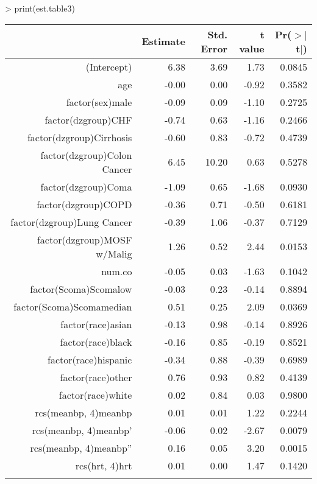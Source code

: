 \documentclass{article}
\begin{document}
\begin{Schunk}
\begin{Sinput}
> print(est.table3)
\end{Sinput}
% latex table generated in R 3.1.1 by xtable 1.7-3 package
% Fri Sep 19 22:45:02 2014
\begin{table}[ht]
\centering
\begin{tabular}{rrrrr}
  \hline
 & Estimate & Std. Error & t value & Pr($>$$|$t$|$) \\ 
  \hline
(Intercept) & 6.38 & 3.69 & 1.73 & 0.0845 \\ 
  age & -0.00 & 0.00 & -0.92 & 0.3582 \\ 
  factor(sex)male & -0.09 & 0.09 & -1.10 & 0.2725 \\ 
  factor(dzgroup)CHF & -0.74 & 0.63 & -1.16 & 0.2466 \\ 
  factor(dzgroup)Cirrhosis & -0.60 & 0.83 & -0.72 & 0.4739 \\ 
  factor(dzgroup)Colon Cancer & 6.45 & 10.20 & 0.63 & 0.5278 \\ 
  factor(dzgroup)Coma & -1.09 & 0.65 & -1.68 & 0.0930 \\ 
  factor(dzgroup)COPD & -0.36 & 0.71 & -0.50 & 0.6181 \\ 
  factor(dzgroup)Lung Cancer & -0.39 & 1.06 & -0.37 & 0.7129 \\ 
  factor(dzgroup)MOSF w/Malig & 1.26 & 0.52 & 2.44 & 0.0153 \\ 
  num.co & -0.05 & 0.03 & -1.63 & 0.1042 \\ 
  factor(Scoma)Scomalow & -0.03 & 0.23 & -0.14 & 0.8894 \\ 
  factor(Scoma)Scomamedian & 0.51 & 0.25 & 2.09 & 0.0369 \\ 
  factor(race)asian & -0.13 & 0.98 & -0.14 & 0.8926 \\ 
  factor(race)black & -0.16 & 0.85 & -0.19 & 0.8521 \\ 
  factor(race)hispanic & -0.34 & 0.88 & -0.39 & 0.6989 \\ 
  factor(race)other & 0.76 & 0.93 & 0.82 & 0.4139 \\ 
  factor(race)white & 0.02 & 0.84 & 0.03 & 0.9800 \\ 
  rcs(meanbp, 4)meanbp & 0.01 & 0.01 & 1.22 & 0.2244 \\ 
  rcs(meanbp, 4)meanbp' & -0.06 & 0.02 & -2.67 & 0.0079 \\ 
  rcs(meanbp, 4)meanbp'' & 0.16 & 0.05 & 3.20 & 0.0015 \\ 
  rcs(hrt, 4)hrt & 0.01 & 0.00 & 1.47 & 0.1420 \\ 
$$
\end{tabular}
\end{table}
\end{Schunk}
\end{document}

